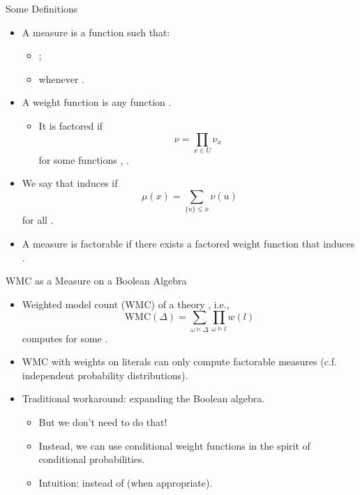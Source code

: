 \documentclass{beamer}
\begin{document}
\begin{frame}{Some Definitions}
  \begin{itemize}
  \item A \alert{measure} is a function  such that:
    \begin{itemize}
    \item {};
    \item {} whenever .
    \end{itemize}
    \pause
  \item A \alert{weight function} is any function .
    \pause
    \begin{itemize}
    \item It is \alert{factored} if
      \[
        \nu = \prod_{x \in U} \nu_x
      \]
      for some functions , .
    \end{itemize}
    \pause
  \item We say that \structure{$\nu$} \alert{induces} \structure{$\mu$} if
    \[
      \mu(x) = \sum_{\{u\} \le x} \nu(u)
    \]
    for all .
    \pause
  \item A measure \structure{$\mu$} is \alert{factorable} if there exists a
    factored weight function \structure{$\nu$} that induces \structure{$\mu$}.
  \end{itemize}
\end{frame}

\begin{frame}{WMC as a Measure on a Boolean Algebra}
  \begin{itemize}
  \item \alert{Weighted model count} (WMC) of a theory \structure{$\Delta$},
    i.e.,
    \[
      \mathrm{WMC}(\Delta) = \sum_{\omega \models \Delta} \prod_{\omega \models
        l} w(l)
    \]
    computes  for some .
    \pause
  \item WMC with weights on literals can only compute \alert{factorable}
    measures (c.f. independent probability distributions).
  \item Traditional workaround: expanding the Boolean algebra.
    \pause
    \begin{itemize}
    \item But we don't need to do that!
    \item Instead, we can use \alert{conditional weight functions} in the spirit
      of conditional probabilities.
    \item Intuition:  instead of
       (when appropriate).
    \end{itemize}
  \end{itemize}
\end{frame}
\end{document}
